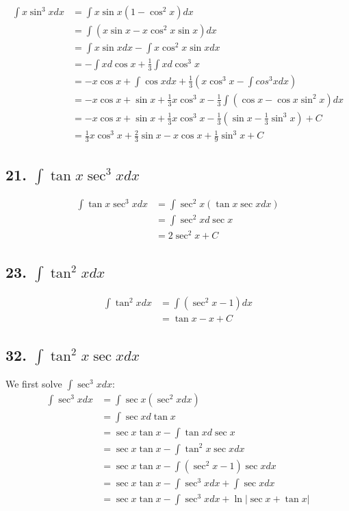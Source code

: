 \documentclass{article}
\begin{document}
    $$\begin{aligned}
         \int x\sin^3 x dx &= \int x \sin x (1 - \cos ^2 x) dx \\
         &= \int (x\sin x - x \cos^2 x \sin x)dx \\
         &= \int x\sin x dx - \int x \cos^2 x \sin x dx \\
         &= -\int xd\cos x + \frac 1 3\int x d\cos ^3 x \\
         &= -x\cos x + \int \cos x dx + \frac 1 3(x \cos ^3 x - \int cos^3 x dx) \\
         &= -x\cos x + \sin x + \frac 1 3 x \cos ^3 x - \frac 1 3 \int (\cos x - \cos x \sin^2 x) dx  \\
         &= -x\cos x + \sin x + \frac 1 3 x \cos ^3 x - \frac 1 3 (\sin x - \frac 1 3 \sin ^3 x) + C \\
         &= \frac 1 3 x \cos ^3 x + \frac 2 3 \sin x - x \cos x + \frac 1 9 \sin^3 x + C
    \end{aligned}$$

    \subsection*{21. $\int \tan x \sec ^3 x dx$}

    $$\begin{aligned}
        \int \tan x \sec^3 x dx &= \int \sec^2 x (\tan x \sec x dx) \\
        &= \int \sec^2 x d\sec x \\
        &= 2\sec^2 x + C
    \end{aligned}$$

    \subsection*{23. $\int \tan^2 x dx$}

    $$\begin{aligned}
        \int \tan^2 x dx &= \int (\sec ^2 x - 1) dx \\
        &= \tan x - x + C
    \end{aligned}$$

    \subsection*{32. $\int \tan^2 x \sec x dx$}

    We first solve $\int \sec^3 x dx$:
    $$\begin{aligned}
        \int \sec^3 x dx &= \int \sec x (\sec^2 x dx) \\
        &= \int \sec x d\tan x \\
        &= \sec x \tan x - \int \tan x d\sec x  \\
        &= \sec x \tan x - \int \tan^2 x \sec x dx \\
        &= \sec x \tan x - \int (\sec^2 x - 1) \sec x dx \\
        &= \sec x \tan x - \int \sec^3 x dx + \int \sec x dx \\
        &= \sec x \tan x - \int \sec^3 x dx + \ln |\sec x + \tan x|
    \end{aligned}$$
\end{document}
